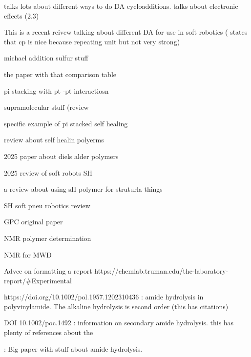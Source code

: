 \cite{briou2021trends} talks lots about different ways to do DA cycloadditions. talks about electronic effects (2.3)


\cite{ratwani2023self} This is a recent reivew talking about different DA for use in soft robotics ( states that cp is nice because repeating unit but not very strong)


\cite{kuhl2016self} michael addition sulfur stuff

\cite{terryn2021review} the paper with that comparison table


\cite{mei2016highly} pi stacking with pt -pt interactiosn


\cite{yang2018self} supramolecular stuff (review

\cite{burattini2009novel} specific example of pi stacked self healing


\cite{srivastav2025comprehensive} review about self healin polyerms


\cite{guo2025diels}  2025 paper about diels alder polymers

\cite{kashef2025toward} 2025 review of soft robots SH

\cite{cioffi2022review} a review about using sH polymer for struturla things


\cite{terryn2017self} SH soft pneu robotics review


\cite{moore1964gel} GPC original paper


\cite{izunobi2011polymer} NMR polymer determination

\cite{shit1986application}NMR for MWD


Advce on formatting a report https://chemlab.truman.edu/the-laboratory-report/#Experimental


https://doi.org/10.1002/pol.1957.1202310436 : amide hydrolysis in polyvinylamide. The alkaline hydrolysis is second order (this has citations) 

DOI 10.1002/poc.1492 :  information on secondary amide hydrolysis. this has plenty of references about the 

\cite{o1970acidic} : Big paper with stuff about amide hydrolysis. 





